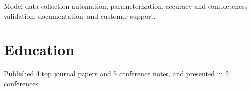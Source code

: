 \documentclass[letterpaper]{deedy-resume-openfont}
\begin{document}
\begin{tightemize}
\item Model data collection automation, parameterization, accuracy and completeness validation, documentation, and customer support.

\end{tightemize}
\sectionsep





\section{Education} 

\begin{tightemize}
\item Published 4 top journal papers and 5 conference notes, and presented in 2 conferences.
\end{tightemize}
\sectionsep
\end{document}
